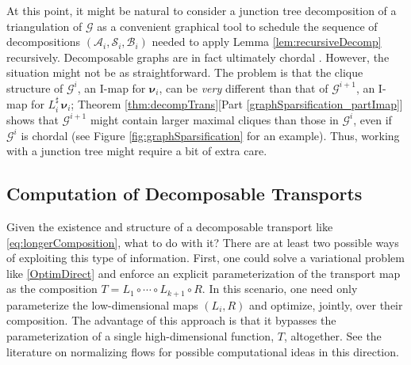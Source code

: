 \documentclass[twoside,11pt]{article}
\newcommand{\genm}{\boldsymbol{\nu} }   %
\newcommand{\Bc}{\mathcal{B}}
\newcommand{\Ac}{\mathcal{A}}
\newcommand{\Sc}{\mathcal{S}}
\newcommand{\Gcb}{\boldsymbol{\mathcal{G}}}
\newcommand{\lmap}{L} %
\newcommand{\Aset}{ \Ac }
\newcommand{\Bset}{ \Bc }
\newcommand{\Sset}{ \Sc }
\newcommand{\pull}{^\sharp}
\begin{document}
At this point, it might be natural to consider a junction tree decomposition of 
a triangulation of $\Gcb$ \citep{koller2009probabilistic} as a convenient
graphical tool to schedule the
sequence of decompositions $(\Aset_i,\Sset_i,\Bset_i)$ needed to apply
Lemma \ref{lem:recursiveDecomp} recursively. 
Decomposable graphs are in fact ultimately chordal \citep{lauritzen1996graphical}.
However, the situation might not be as straightforward.
The problem
is that the clique structure of $\Gcb^i$, an I-map for $\genm_i$, can be
{\it very} different than that of $\Gcb^{i+1}$, an I-map for $\lmap_i
\pull \, \genm_i$; Theorem 
\ref{thm:decompTrans}[Part \ref{graphSparsification_partImap}]
shows that  $\Gcb^{i+1}$ might contain larger maximal cliques than those in 
$\Gcb^i$,  even
if $\Gcb^i$ is chordal (see Figure \ref{fig:graphSparsification} for an
example). 
Thus, working with a junction tree might require a bit of extra care.
%
%

%
%

\subsection{Computation of Decomposable Transports}
\label{sec:compDecompTrans}
%
Given the existence and structure of a decomposable transport
like \eqref{eq:longerComposition}, what to do with it?
%
There are at least two possible ways of exploiting this type of information.
%
First, one could solve a variational
problem like \eqref{OptimDirect} 
%
%
and enforce an explicit
parameterization of the transport map as the composition
%
$T=\lmap_1 \circ \cdots \circ \lmap_{k+1} \circ R$.   
 In this scenario, one need only
parameterize the low-dimensional maps $(\lmap_i, R)$ and optimize, jointly,
over their composition.  The advantage of this approach is that it
bypasses the parameterization of a single high-dimensional function,
$T$, altogether.
See the literature on normalizing flows \citep{rezende2015variational} 
for possible computational
ideas in this direction.  
\end{document}
